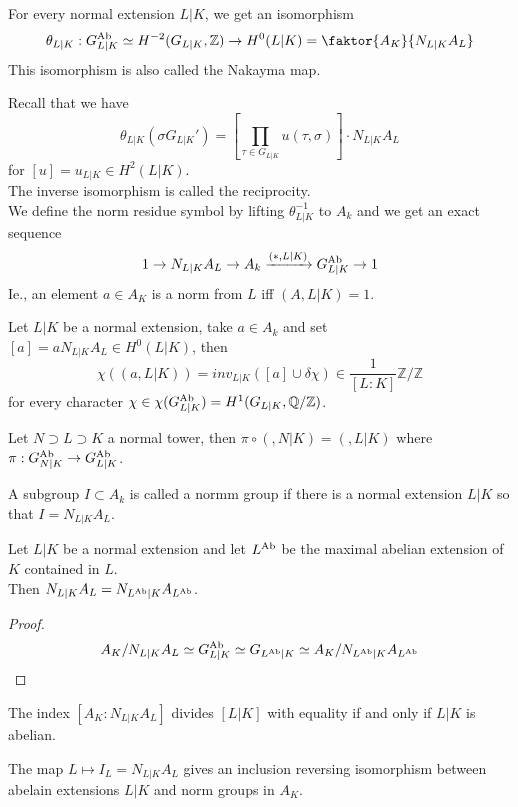 \documentclass[../main.tex]{subfiles}
\begin{document}
\begin{thm} 
	For every normal extension $L|K$, we get an isomorphism
	\[ 
	\theta_{L|K} : G_{L|K}^{\ab}\simeq H^{-2}( G_{L|K} , \mathbb{Z}) \to H^{0}( L|K) = \faktor{A_K}{N_{L|K} A_L}	
	\]
	This isomorphism is also called the Nakayma map.
\end{thm}
Recall that we have
\[ 
\theta_{L|K} ( \sigma G_{L|K}') = \left[ \prod_{\tau \in G_{L|K} } u( \tau,\sigma) \right] \cdot N_{L|K} A_L
\]
for $[u] = u_{L|K} \in H^{2}( L|K) $.\\
The inverse isomorphism is called the reciprocity.\\
We define the norm residue symbol by lifting $\theta_{L|K}^{-1}$ to $A_k $ and we get an exact sequence
\[ 
	1\to N_{L|K} A_L \to A_k \xrightarrow{( \ast,L|K) } G_{L|K}^{\operatorname{Ab}}\to 1
\]
Ie., an element $a\in A_K$ is a norm from $L$ iff $( A,L|K) =1$.
\begin{lemma}
	Let $L|K$ be a normal extension, take $a\in A_k$ and set $[a] = a N_{L|K} A_L\in H^{0}( L|K) $, then
	\[ 
		\chi( ( a,L|K) ) = inv_{L|K} ( [ a] \cup \delta \chi) \in \frac{1}{[L:K]} \mathbb{Z} /\mathbb{Z}
	\]
	for every character $\chi\in \chi( G_{L|K}^{\operatorname{Ab}}) = H^{1}( G_{L|K} , \mathbb{Q}/\mathbb{Z}) $.
\end{lemma}
\begin{thm}
	Let $N \supset L \supset K$ a normal tower, then $\pi\circ( ,N|K)= ( , L|K)  $ where $\pi:G_{N|K}^{\operatorname{Ab}}\to G_{L|K}^{\operatorname{Ab}}$.
	
\end{thm}
\begin{defn}
	A subgroup $I \subset A_k$ is called a normm group if there is a normal extension $L|K$ so that $I= N_{L|K} A_L$.
\end{defn}
\begin{thm}
		Let $L|K$ be a normal extension and let $L^{\operatorname{Ab}}$ be the maximal abelian extension of $K$ contained in $L$.\\
		Then $N_{L|K} A_L= N_{L^{\operatorname{Ab}}|K} A_{L^{\operatorname{Ab}}} $.
\end{thm}
\begin{proof}
\[ 
A_K /N_{L|K} A_L\simeq G_{L|K} ^{\operatorname{Ab}}\simeq G_{L^{\operatorname{Ab}}|K} \simeq A_K /N_{L^{\operatorname{Ab}}|K} A_{L^{\operatorname{Ab}}} 
\]

\end{proof}
\begin{crly}
	The index $[A_K:N_{L|K} A_L] $ divides $[L|K]$ with equality if and only if $L|K$ is abelian.
\end{crly}
\begin{thm}
The map $L\mapsto I_L= N_{L|K} A_L$ gives an inclusion reversing isomorphism between abelain extensions $L|K$ and norm groups in $A_K$.
\end{thm}
\end{document}
